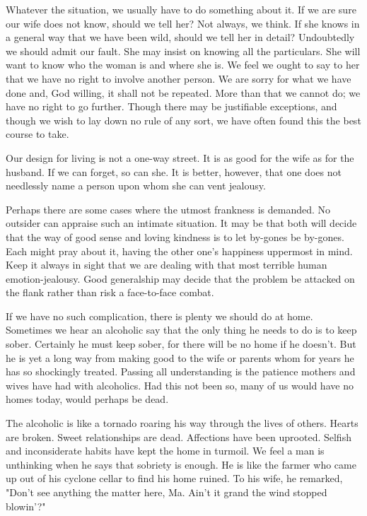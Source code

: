 \begin{biblechapter}
Whatever the situation, we usually have to do something about it.  If we are sure our wife does not know, should we tell her?  Not always, we think.  If she knows in a general way that we have been wild, should we tell her in detail?  Undoubtedly we should admit our fault.  She may insist on knowing all the particulars.  She will want to know who the woman is and where she is.  We feel we ought to say to her that we have no right to involve another person.  We are sorry for what we have done and, God willing, it shall not be repeated.  More than that we cannot do; we have no right to go further.  Though there may be justifiable exceptions, and though we wish to lay down no rule of any sort, we have often found this the best course to take.

Our design for living is not a one-way street.  It is as good for the wife as for the husband.  If we can forget, so can she.  It is better, however, that one does not needlessly name a person upon whom she can vent jealousy.

Perhaps there are some cases where the utmost frankness is demanded.  No outsider can appraise such an intimate situation.  It may be that both will decide that the way of good sense and loving kindness is to let by-gones be by-gones.  Each might pray about it, having the other one's happiness uppermost in mind.  Keep it always in sight that we are dealing with that most terrible human emotion-jealousy.  Good generalship may decide that the problem be attacked on the flank rather than risk a face-to-face combat.

If we have no such complication, there is plenty we should do at home.  Sometimes we hear an alcoholic say that the only thing he needs to do is to keep sober.  Certainly he must keep sober, for there will be no home if he doesn't.  But he is yet a long way from making good to the wife or parents whom for years he has so shockingly treated.  Passing all understanding is the patience mothers and wives have had with alcoholics.  Had this not been so, many of us would have no homes today, would perhaps be dead.

The alcoholic is like a tornado roaring his way through the lives of others.  Hearts are broken.  Sweet relationships are dead.  Affections have been uprooted.  Selfish and inconsiderate habits have kept the home in turmoil.  We feel a man is unthinking when he says that sobriety is enough.  He is like the farmer who came up out of his cyclone cellar to find his home ruined.  To his wife, he remarked, "Don't see anything the matter here, Ma.  Ain't it grand the wind stopped blowin'?"


\end{biblechapter}
